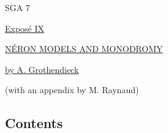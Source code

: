 
\begin{center}
SGA 7

\vspace{1em}
\underline{Expos\'e IX}

\vspace{1em}
\underline{\underline{N\'ERON MODELS AND MONODROMY}}

\vspace{1em}
\underline{by A. Grothendieck}

(with an appendix by M. Raynaud)
\end{center}

\subsection*{Contents}


